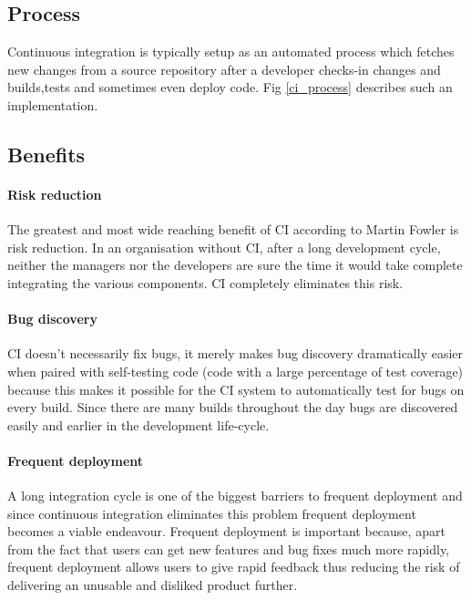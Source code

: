 \documentclass[12pt,conference]{IEEEtran}
\begin{document}
\subsection*{Process}

Continuous integration is typically setup as an automated process which fetches new changes from a source repository after a developer checks-in changes and builds,tests and sometimes even deploy code. Fig \ref{ci_process} describes such an implementation.

\subsection*{Benefits}

\paragraph*{Risk reduction}The greatest and most wide reaching benefit of CI according to Martin Fowler \cite{fowler_continuous_2006} is risk reduction. In an organisation without CI, after a long development cycle, neither the managers nor the developers are sure the time it would take complete integrating the various components. CI completely eliminates this risk.

\paragraph*{Bug discovery} CI doesn't necessarily fix bugs, it merely makes bug discovery dramatically easier when paired with self-testing code (code with a large percentage of test coverage) because this makes it possible for the CI system to automatically test for bugs on every build. Since there are many builds throughout the day bugs are discovered easily and earlier in the development life-cycle.

\paragraph*{Frequent deployment} A long integration cycle is one of the biggest barriers to frequent deployment \cite{fowler_continuous_2006} and since continuous integration eliminates this problem frequent deployment becomes a viable endeavour. Frequent deployment is important because, apart from the fact that users can get new features and bug fixes much more rapidly, frequent deployment allows users to give rapid feedback thus reducing the risk of delivering an unusable and disliked product further.
\end{document}
